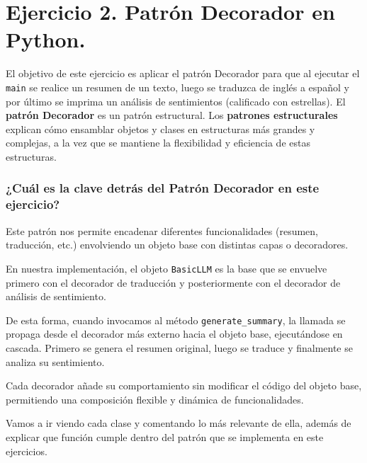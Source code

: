 \documentclass[a4paper,12pt]{article}
\begin{document}
		\newpage
	
	\section{Ejercicio 2. Patrón Decorador en Python.}
		El objetivo de este ejercicio es aplicar el patrón Decorador para que al ejecutar el \texttt{main} se realice un resumen de un texto, luego se traduzca de inglés a español y por último se imprima un análisis de sentimientos (calificado con estrellas). 
		El \textbf{patrón Decorador} es un patrón estructural. Los \textbf{patrones estructurales} explican cómo ensamblar objetos y clases en estructuras más grandes y complejas, a la vez que se mantiene la flexibilidad y eficiencia de estas estructuras. 
		\subsubsection*{¿Cuál es la clave detrás del Patrón Decorador en este ejercicio?}

		Este patrón nos permite encadenar diferentes funcionalidades (resumen, traducción, etc.) envolviendo un objeto base con distintas capas o decoradores.

		En nuestra implementación, el objeto \texttt{BasicLLM} es la base que se envuelve primero con el decorador de traducción y posteriormente con el decorador de análisis de sentimiento.

		De esta forma, cuando invocamos al método \texttt{generate\_summary}, la llamada se propaga desde el decorador más externo hacia el objeto base, ejecutándose en cascada. Primero se genera el resumen original, luego se traduce y finalmente se analiza su sentimiento.

		Cada decorador añade su comportamiento sin modificar el código del objeto base, permitiendo una composición flexible y dinámica de funcionalidades.
		
		Vamos a ir viendo cada clase y comentando lo más relevante de ella, además de explicar que función cumple dentro del patrón que se implementa en este ejercicios.
		
\end{document}
